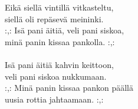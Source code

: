 
            Eikä siellä vintillä vitkasteltu, \\
            siellä oli repäsevä meininki. \\
            :,: Isä pani äitiä, veli pani siskoa, \\
            minä panin kissaa pankolla. :,: \\
\hspace{10mm} \\
            Isä pani äitiä kahvin keittoon, \\
            veli pani siskoa nukkumaan. \\
            :,: Minä panin kissaa pankon päällä \\
            uusia rottia jahtaamaan. :,: \\
